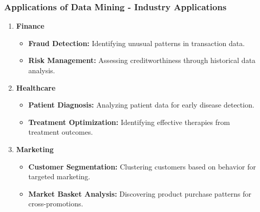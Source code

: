 \documentclass[aspectratio=169]{beamer}
\begin{document}
\begin{frame}[fragile]
    \frametitle{Applications of Data Mining - Industry Applications}
    \begin{enumerate}
        \item \textbf{Finance}
            \begin{itemize}
                \item \textbf{Fraud Detection:} Identifying unusual patterns in transaction data.
                \item \textbf{Risk Management:} Assessing creditworthiness through historical data analysis.
            \end{itemize}
        \item \textbf{Healthcare}
            \begin{itemize}
                \item \textbf{Patient Diagnosis:} Analyzing patient data for early disease detection.
                \item \textbf{Treatment Optimization:} Identifying effective therapies from treatment outcomes.
            \end{itemize}
        \item \textbf{Marketing}
            \begin{itemize}
                \item \textbf{Customer Segmentation:} Clustering customers based on behavior for targeted marketing.
                \item \textbf{Market Basket Analysis:} Discovering product purchase patterns for cross-promotions.
            \end{itemize}
    \end{enumerate}
\end{frame}
\end{document}
